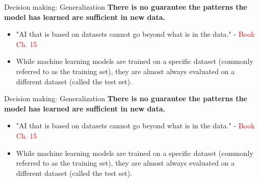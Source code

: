 \documentclass[8pt]{beamer}
\begin{document}
	\begin{frame}[t]{Decision making: Generalization} %
		\centering
		\textbf{There is no guarantee the patterns the model has learned are sufficient in new data.}
		\begin{itemize}
			\item "AI that is based on datasets cannot go beyond what is in the data." - \textcolor{red}{Book Ch. 15}
			\item While machine learning models are trained on a specific dataset (commonly referred to as the training set), they are almost always evaluated on a different dataset (called the test set).
		\end{itemize}
		\vspace{0.5cm}
	\end{frame}

	\begin{frame}[t]{Decision making: Generalization} %
		\centering
		\textbf{There is no guarantee the patterns the model has learned are sufficient in new data.}
		\begin{itemize}
			\item "AI that is based on datasets cannot go beyond what is in the data." - \textcolor{red}{Book Ch. 15}
			\item While machine learning models are trained on a specific dataset (commonly referred to as the training set), they are almost always evaluated on a different dataset (called the test set).
		\end{itemize}
		\vspace{0.5cm}
	\end{frame}
\end{document}
